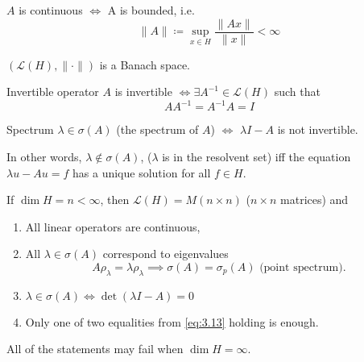 \documentclass{report}
\begin{document}
\begin{lemma}{}{}
    \(A\) is continuous \(\iff\) A is bounded, i.e.
    \[
        \|A\| \coloneqq  \sup_{x \in H} \frac{\|Ax\|}{\|x\|} < \infty
    \]
\end{lemma}

\begin{lemma}{}{}
    \((\mathcal{L}(H), \|\cdot\|)\) is a Banach space. 
\end{lemma}

\begin{definition}{Invertible operator}{}
    \(A\) is invertible \(\iff \exists A^{-1} \in \mathcal{L}(H)\) such that
    \begin{equation}\label{eq:3.13}
        AA^{-1} = A^{-1}A = I
    \end{equation}
\end{definition}

\begin{definition}{Spectrum}{}
    \(\lambda \in \sigma(A)\) (the spectrum of \(A\)) \(\iff\) \(\lambda I - A\) is not invertible.

    In other words, \(\lambda \notin \sigma(A)\), (\(\lambda\) is in the resolvent set) iff the equation \(\lambda u - Au = f\) has a unique solution for all \(f \in H\).
\end{definition}

\begin{note}
    If \(\dim H = n < \infty\), then \(\mathcal{L}(H) = M(n \times n)\) (\(n \times n\) matrices) and
    \begin{enumerate}
        \item All linear operators are continuous,
        \item All \(\lambda\in \sigma(A)\) correspond to eigenvalues
        \[
            A \rho_{\lambda} = \lambda \rho_{\lambda} \implies \sigma(A) = \sigma_{p}(A)\text{ (point spectrum).}
        \]
        \item \(\lambda \in \sigma(A) \iff \det(\lambda I - A) = 0\)
        \item Only one of two equalities from \ref{eq:3.13} holding is enough. 
    \end{enumerate}
    All of the statements may fail when \(\dim H = \infty\).
\end{note}
\end{document}
